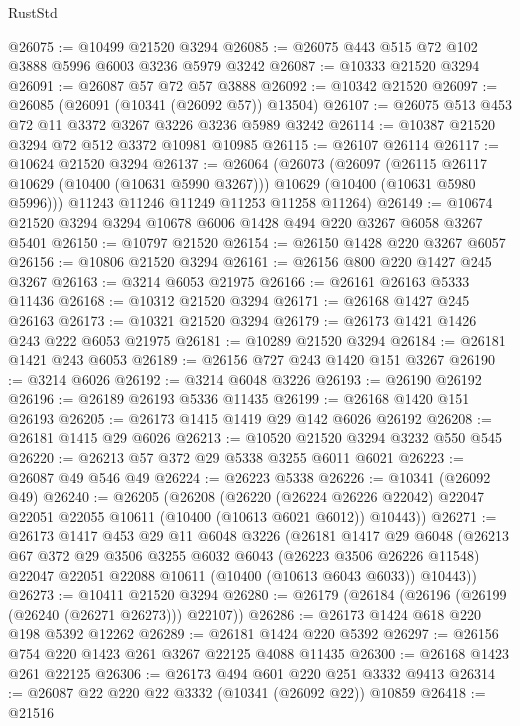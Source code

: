 \begin{lexlean}{RustStd}
\begin{coremodule}
{\begin{coremodule}
{{{{{{{{{{{{{{{{{{{{{{{{{@26075 := @10499 @21520 @3294
@26085 := @26075 @443 @515 @72 @102 @3888 @5996 @6003 @3236 @5979 @3242
@26087 := @10333 @21520 @3294
@26091 := @26087 @57 @72 @57 @3888
@26092 := @10342 @21520
@26097 := @26085 (@26091 (@10341 (@26092 @57)) @13504)
@26107 := @26075 @513 @453 @72 @11 @3372 @3267 @3226 @3236 @5989 @3242
@26114 := @10387 @21520 @3294 @72 @512 @3372 @10981 @10985
@26115 := @26107 @26114
@26117 := @10624 @21520 @3294
@26137 := @26064
    (@26073
      (@26097
        (@26115 @26117 @10629 (@10400 (@10631 @5990 @3267)))
        @10629
        (@10400 (@10631 @5980 @5996)))
      @11243
      @11246
      @11249
      @11253
      @11258
      @11264)
@26149 := @10674 @21520 @3294 @3294 @10678 @6006 @1428 @494 @220 @3267 @6058 @3267 @5401
@26150 := @10797 @21520
@26154 := @26150 @1428 @220 @3267 @6057
@26156 := @10806 @21520 @3294
@26161 := @26156 @800 @220 @1427 @245 @3267
@26163 := @3214 @6053 @21975
@26166 := @26161 @26163 @5333 @11436
@26168 := @10312 @21520 @3294
@26171 := @26168 @1427 @245 @26163
@26173 := @10321 @21520 @3294
@26179 := @26173 @1421 @1426 @243 @222 @6053 @21975
@26181 := @10289 @21520 @3294
@26184 := @26181 @1421 @243 @6053
@26189 := @26156 @727 @243 @1420 @151 @3267
@26190 := @3214 @6026
@26192 := @3214 @6048 @3226
@26193 := @26190 @26192
@26196 := @26189 @26193 @5336 @11435
@26199 := @26168 @1420 @151 @26193
@26205 := @26173 @1415 @1419 @29 @142 @6026 @26192
@26208 := @26181 @1415 @29 @6026
@26213 := @10520 @21520 @3294 @3232 @550 @545
@26220 := @26213 @57 @372 @29 @5338 @3255 @6011 @6021
@26223 := @26087 @49 @546 @49
@26224 := @26223 @5338
@26226 := @10341 (@26092 @49)
@26240 := @26205
    (@26208
      (@26220
        (@26224 @26226 @22042)
        @22047
        @22051
        @22055
        @10611
        (@10400 (@10613 @6021 @6012))
        @10443))
@26271 := @26173
    @1417
    @453
    @29
    @11
    @6048
    @3226
    (@26181
      @1417
      @29
      @6048
      (@26213
        @67
        @372
        @29
        @3506
        @3255
        @6032
        @6043
        (@26223 @3506 @26226 @11548)
        @22047
        @22051
        @22088
        @10611
        (@10400 (@10613 @6043 @6033))
        @10443))
@26273 := @10411 @21520 @3294
@26280 := @26179 (@26184 (@26196 (@26199 (@26240 (@26271 @26273))) @22107))
@26286 := @26173 @1424 @618 @220 @198 @5392 @12262
@26289 := @26181 @1424 @220 @5392
@26297 := @26156 @754 @220 @1423 @261 @3267 @22125 @4088 @11435
@26300 := @26168 @1423 @261 @22125
@26306 := @26173 @494 @601 @220 @251 @3332 @9413
@26314 := @26087 @22 @220 @22 @3332 (@10341 (@26092 @22)) @10859
@26418 := @21516
}}}}}}}}}}}}}}}}}}}}}}}}}
\end{coremodule}}
\end{coremodule}
\end{lexlean}
